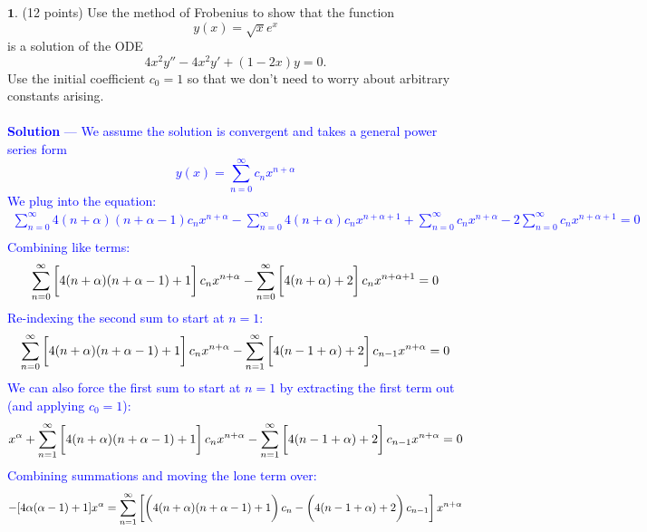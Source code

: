 \documentclass[12pt]{article}
\begin{document}
\noindent $\textbf{1}$. (12 points) Use the method of Frobenius to show that the function
$$y(x) = \sqrt{x} e^x$$
is a solution of the ODE
$$4x^2 y'' - 4x^2y' + (1-2x)y = 0.$$
Use the initial coefficient $c_0 = 1$ so that we don't need to worry about arbitrary constants arising. \\ \\
\textcolor{blue}{\textbf{Solution} — We assume the solution is convergent and takes a general power series form
$$y(x) = \sum_{n=0}^\infty c_n x^{n + \alpha}$$
We plug into the equation:
\begin{align*}
\sum_{n=0}^\infty 4(n + \alpha)(n + \alpha - 1) c_n x^{n + \alpha} - \sum_{n=0}^\infty 4(n+\alpha)  c_n x^{n+\alpha + 1} + \sum_{n=0}^\infty c_n x^{n + \alpha} - 2\sum_{n=0}^\infty c_n x^{n + \alpha + 1} = 0 \\
\end{align*}
Combining like terms:
\begin{align*}
\sum_{n=0}^\infty \left[ \vphantom{\frac{1}{1}} 4(n + \alpha)(n + \alpha - 1) + 1 \right] c_n x^{n + \alpha} - \sum_{n=0}^{\infty} \left[ \vphantom{\frac{1}{1}} 4(n+\alpha) + 2 \right] c_n x^{n+\alpha + 1} = 0 \\
\end{align*}
Re-indexing the second sum to start at $n=1$:
\begin{align*}
\sum_{n=0}^\infty \left[ \vphantom{\frac{1}{1}} 4(n + \alpha)(n + \alpha - 1) + 1 \right] c_n x^{n + \alpha} - \sum_{n=1}^{\infty} \left[ \vphantom{\frac{1}{1}} 4(n-1+\alpha) + 2 \right] c_{n-1} x^{n+\alpha} = 0 \\
\end{align*}
We can also force the first sum to start at $n=1$ by extracting the first term out (and applying $c_0 = 1$):
\begin{align*}
[ 4\alpha (\alpha - 1) + 1] x^\alpha + \sum_{n=1}^\infty \left[ \vphantom{\frac{1}{1}} 4(n + \alpha)(n + \alpha - 1) + 1 \right] c_n x^{n + \alpha} - \sum_{n=1}^{\infty} \left[ \vphantom{\frac{1}{1}} 4(n-1+\alpha) + 2 \right] c_{n-1} x^{n+\alpha} = 0 \\
\end{align*}
Combining summations and moving the lone term over:
\begin{align*}
-[ 4\alpha (\alpha - 1) + 1] x^\alpha = \sum_{n=1}^\infty \left[ \left( \vphantom{\frac{1}{1}} 4(n + \alpha)(n + \alpha - 1) + 1 \right) c_n - \left( \vphantom{\frac{1}{1}} 4(n-1+\alpha) + 2 \right) c_{n-1} \right] x^{n+\alpha} \\
\end{align*}
}
\end{document}
